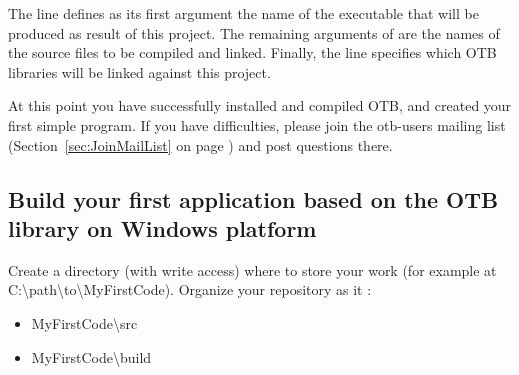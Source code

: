 The line  defines as its first argument the name of the executable that will be produced as result of this project. The remaining arguments of  are the names of the source files to be compiled and linked.  Finally, the  line specifies which OTB libraries will be linked against this project.



At this point you have successfully installed and compiled OTB, and created your first simple program. If you have difficulties, please join the otb-users mailing list (Section~\ref{sec:JoinMailList} on page \pageref{sec:JoinMailList}) and post questions there.


\subsection{Build your first application based on the OTB library on Windows platform}
\label{sec:FirstWinAppOTB}

Create a directory (with write access) where to store your work (for example at C:\textbackslash path\textbackslash to\textbackslash MyFirstCode).
Organize your repository as it :
\begin{itemize}
\item MyFirstCode\textbackslash src
\item MyFirstCode\textbackslash build
\end{itemize}

